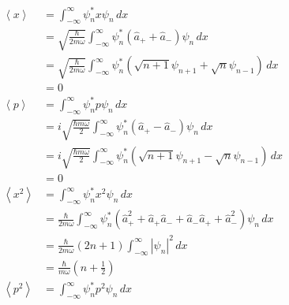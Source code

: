 \documentclass{article}
\newcommand{\ev}[1]{\left< #1 \right>}
\begin{document}
\begin{align*}
  \ev{x}   & = \int_{-\infty}^\infty \psi_n^* x \psi_n \,d x                                                                                                \\
           & = \sqrt{\frac{\hbar}{2 m \omega}} \int_{-\infty}^\infty \psi_n^* (\hat{a}_+ + \hat{a}_-) \psi_n \,d x                                          \\
           & = \sqrt{\frac{\hbar}{2 m \omega}} \int_{-\infty}^\infty \psi_n^* (\sqrt{n + 1} \psi_{n + 1} + \sqrt{n} \psi_{n - 1}) \,d x                     \\
           & = 0                                                                                                                                            \\
  \ev{p}   & = \int_{-\infty}^\infty \psi_n^* p \psi_n \,d x                                                                                                \\
           & = i \sqrt{\frac{\hbar m \omega}{2}} \int_{-\infty}^\infty \psi_n^* (\hat{a}_+ - \hat{a}_-) \psi_n \,d x                                        \\
           & = i \sqrt{\frac{\hbar m \omega}{2}} \int_{-\infty}^\infty \psi_n^* (\sqrt{n + 1} \psi_{n + 1} - \sqrt{n} \psi_{n - 1}) \,d x                   \\
           & = 0                                                                                                                                            \\
  \ev{x^2} & = \int_{-\infty}^\infty \psi_n^* x^2 \psi_n \,d x                                                                                              \\
           & = \frac{\hbar}{2 m \omega} \int_{-\infty}^\infty \psi_n^* (\hat{a}_+^2 + \hat{a}_+ \hat{a}_- + \hat{a}_- \hat{a}_+ + \hat{a}_-^2) \psi_n \,d x \\
           & = \frac{\hbar}{2 m \omega} (2 n + 1) \int_{-\infty}^\infty |\psi_n|^2 \,d x                                                                    \\
           & = \frac{\hbar}{m \omega} \left( n + \frac{1}{2} \right)                                                                                        \\
  \ev{p^2} & = \int_{-\infty}^\infty \psi_n^* p^2 \psi_n \,d x                                                                                              \\

\end{align*}
\end{document}
